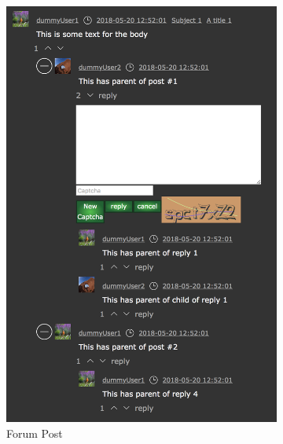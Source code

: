 \documentclass[a4paper]{article}
\begin{document}
\begin{figure}[h!]
\begin{subfigure}[b]{0.3\linewidth}
    \includegraphics[width=\linewidth]{images/forum-posts.png}
    \caption{Forum Post}
    \label{fig:forum_post}
  \end{subfigure}
  \caption{}
\end{figure}
\end{document}
